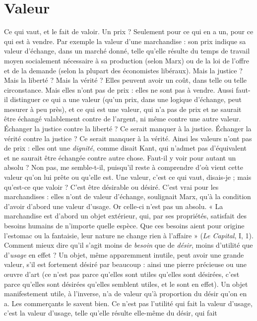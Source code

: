 \section{Valeur}
Ce qui vaut, et le fait de valoir. Un prix ? Seulement pour ce qui
en a un, pour ce qui est à vendre. Par exemple la valeur d’une
marchandise : son prix indique sa valeur d’échange, dans un marché donné,
telle qu’elle résulte du temps de travail moyen socialement nécessaire à sa production
(selon Marx) ou de la loi de l'offre et de la demande (selon la plupart
des économistes libéraux). Mais la justice ? Mais la liberté ? Mais la vérité ?
Elles peuvent avoir un coût, dans telle ou telle circonstance. Mais elles n’ont
pas de prix : elles ne sont pas à vendre. Aussi faut-il distinguer ce qui a une
valeur (qu’un prix, dans une logique d’échange, peut mesurer à peu près), et ce
qui est une valeur, qui n’a pas de prix et ne saurait être échangé valablement
contre de l'argent, ni même contre une autre valeur. Échanger la justice contre
la liberté ? Ce serait manquer à la justice. Échanger la vérité contre la justice ?
Ce serait manquer à la vérité. Ainsi les valeurs n’ont pas de prix : elles ont une
{\it dignité}, comme disait Kant, qui n’admet pas d’équivalent et ne saurait être
échangée contre autre chose. Faut-il y voir pour autant un absolu ? Non pas,
me semble-t-il, puisqu'il reste à comprendre d’où vient cette valeur qu’on lui
prête ou qu’elle est. Une valeur, c’est ce qui vaut, disais-je ; mais qu'est-ce que
valoir ? C’est être désirable ou désiré. C’est vrai pour les marchandises : elles
n’ont de valeur d'échange, soulignait Marx, qu’à la condition d’avoir d’abord
une valeur d'usage. Or celle-ci n’est pas un absolu. « La marchandise est
d’abord un objet extérieur, qui, par ses propriétés, satisfait des besoins humains
de n’importe quelle espèce. Que ces besoins aient pour origine l’estomac ou la
fantaisie, leur nature ne change rien à l’affaire » ({\it Le Capital}, I, 1). Comment
mieux dire qu’il s’agit moins de {\it besoin} que de {\it désir}, moins d’utilité que d’{\it usage}
en effet ? Un objet, même apparemment inutile, peut avoir une grande valeur,
s’il est fortement désiré par beaucoup : ainsi une pierre précieuse ou une œuvre
d’art (ce n’est pas parce qu’elles sont utiles qu’elles sont désirées, c’est parce
qu’elles sont désirées qu’elles semblent utiles, et le sont en effet). Un objet
manifestement utile, à l'inverse, n’a de valeur qu’à proportion du désir qu’on
en a. Les commerçants le savent bien. Ce n’est pas l'utilité qui fait la valeur
d'usage, c’est la valeur d’usage, telle qu’elle résulte elle-même du désir, qui fait
